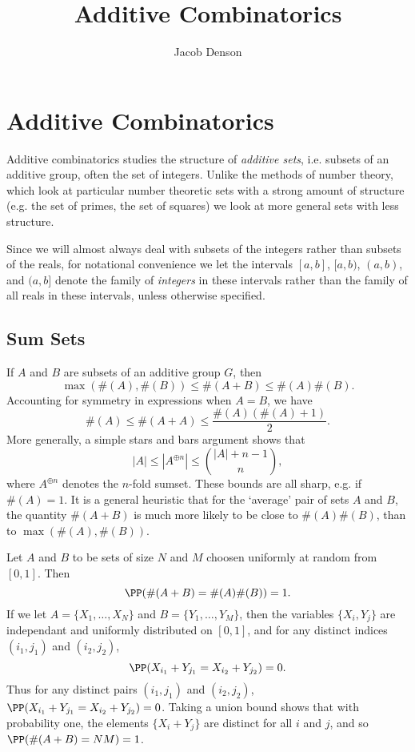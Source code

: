 

\title{Additive Combinatorics}
\author{Jacob Denson}




\maketitle

\tableofcontents


\chapter{Additive Combinatorics}

Additive combinatorics studies the structure of \emph{additive sets}, i.e. subsets of an additive group, often the set of integers. Unlike the methods of number theory, which look at particular number theoretic sets with a strong amount of structure (e.g. the set of primes, the set of squares) we look at more general sets with less structure.

Since we will almost always deal with subsets of the integers rather than subsets of the reals, for notational convenience we let the intervals $[a,b]$, $[a,b)$, $(a,b)$, and $(a,b]$ denote the family of \emph{integers} in these intervals rather than the family of all reals in these intervals, unless otherwise specified.

\section{Sum Sets}

If $A$ and $B$ are subsets of an additive group $G$, then
%
\[ \max(\#(A),\#(B)) \leq \#(A + B) \leq \#(A) \#(B). \]
%
Accounting for symmetry in expressions when $A = B$, we have
%
\[ \#(A) \leq \#(A + A) \leq \frac{\#(A) (\#(A) + 1)}{2}. \]
%
More generally, a simple stars and bars argument shows that
%
\[ |A| \leq |A^{\oplus n}| \leq {{|A| + n - 1}\choose{n}}, \]
%
where $A^{\oplus n}$ denotes the $n$-fold sumset. These bounds are all sharp, e.g. if $\#(A) = 1$. It is a general heuristic that for the `average' pair of sets $A$ and $B$, the quantity $\#(A + B)$ is much more likely to be close to $\#(A) \#(B)$, than to $\max(\#(A),\#(B))$.

\begin{example}
    Let $A$ and $B$ to be sets of size $N$ and $M$ choosen uniformly at random from $[0,1]$. Then
    \[ \PP(\#(A + B) = \#(A) \#(B)) = 1. \]
    If we let $A = \{ X_1,\dots, X_N \}$ and $B = \{ Y_1, \dots, Y_M \}$, then the variables $\{ X_i, Y_j \}$ are independant and uniformly distributed on $[0,1]$, and for any distinct indices $(i_1,j_1)$ and $(i_2,j_2)$,
    \[ \PP(X_{i_1} + Y_{j_1} = X_{i_2} + Y_{j_2}) = 0. \]
    Thus for any distinct pairs $(i_1,j_1)$ and $(i_2,j_2)$, $\PP(X_{i_1} + Y_{j_1} = X_{i_2} + Y_{j_2}) = 0$. Taking a union bound shows that with probability one, the elements $\{ X_i + Y_j \}$ are distinct for all $i$ and $j$, and so $\PP(\#(A + B) = NM) = 1$.
\end{example}

